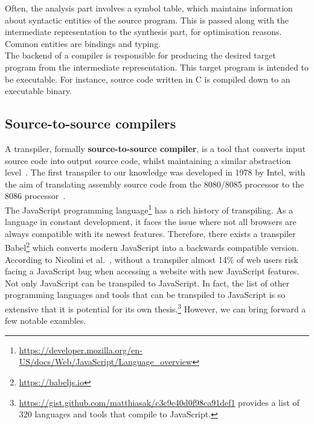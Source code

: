 Often, the analysis part involves a symbol table, which maintains information about syntactic entities of the source program. This is passed along with the intermediate representation to the synthesis part, for optimisation reasons. Common entities are bindings and typing. \hfill \\

The backend of a compiler is responsible for producing the desired target program from the intermediate representation. This target program is intended to be executable. For instance, source code written in C is compiled down to an executable binary.

\subsection{Source-to-source compilers}

A transpiler, formally \textbf{source-to-source compiler}, is a tool that converts input source code into output source code, whilst maintaining a similar abstraction level~\cite{DBLP:conf/els/MarcelinoL22}. The first transpiler to our knowledge was developed in 1978 by Intel, with the aim of translating assembly source code from the 8080/8085 processor to the 8086 processor~\cite{intel1979}. \hfill \\

The JavaScript programming language\footnote{\url{https://developer.mozilla.org/en-US/docs/Web/JavaScript/Language_overview}} has a rich history of transpiling.
As a language in constant development, it faces the issue where not all browsers are always compatible with its newest features. Therefore, there exists a transpiler Babel\footnote{\url{https://babeljs.io}} which converts modern JavaScript into a backwards compatible version. According to Nicolini et al.~\cite{DBLP:journals/software/NicoliniHF24}, without a transpiler almost 14\% of web users risk facing a JavaScript bug when accessing a website with new JavaScript features. \hfill \\

Not only JavaScript can be transpiled to JavaScript. In fact, the list of other programming languages and tools that can be transpiled to JavaScript is so extensive that it is potential for its own thesis.\footnote{\url{https://gist.github.com/matthiasak/c3c9c40d0f98ca91def1} provides a list of 320 languages and tools that compile to JavaScript.} However, we can bring forward a few notable exambles. \hfill \\


